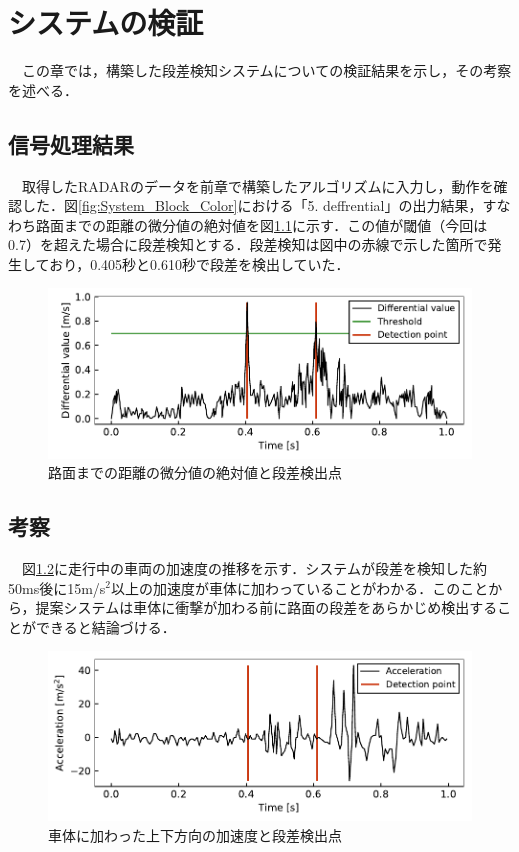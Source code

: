 \chapter{システムの検証}
　この章では，構築した段差検知システムについての検証結果を示し，その考察を述べる．

\section{信号処理結果}
　取得したRADARのデータを前章で構築したアルゴリズムに入力し，動作を確認した．図\ref{fig:System_Block_Color}における「5. deffrential」の出力結果，すなわち路面までの距離の微分値の絶対値を図\ref{fig:result_radar}に示す．この値が閾値（今回は0.7）を超えた場合に段差検知とする．段差検知は図中の赤線で示した箇所で発生しており，0.405秒と0.610秒で段差を検出していた．
\begin{figure}[H]
    \centering
    \includegraphics[width=13cm]{./fig/result_radar.pdf}
    \caption{路面までの距離の微分値の絶対値と段差検出点}
    \label{fig:result_radar}
\end{figure}

\section{考察}
　図\ref{fig:result_acc}に走行中の車両の加速度の推移を示す．システムが段差を検知した約50ms後に15m/s$^2$以上の加速度が車体に加わっていることがわかる．このことから，提案システムは車体に衝撃が加わる前に路面の段差をあらかじめ検出することができると結論づける．
\begin{figure}[H]
    \centering
    \includegraphics[width=13cm]{./fig/result_acc.pdf}
    \caption{車体に加わった上下方向の加速度と段差検出点}
    \label{fig:result_acc}
\end{figure}

